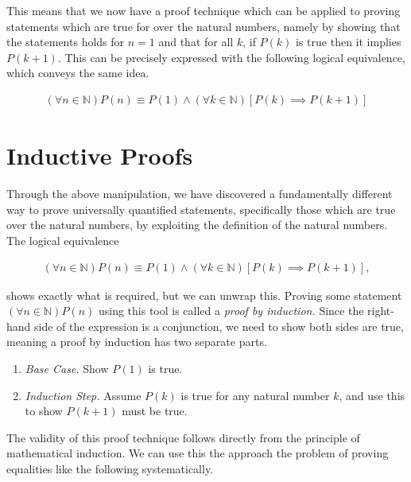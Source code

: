 \documentclass[twoside]{report}
\begin{document}
This means that we now have a proof technique which can be applied to proving statements which are true for over the natural numbers, namely by showing that the statements holds for $n = 1$ and that for all $k$, if $P(k)$ is true then it implies $P(k + 1)$. This can be precisely expressed with the following logical equivalence, which conveys the same idea.

\begin{align*}
	(\forall n \in \mathbb{N})P(n) \equiv P(1) \land (\forall k \in \mathbb{N})[P(k) \implies P(k + 1)]
\end{align*}

\section{Inductive Proofs}

Through the above manipulation, we have discovered a fundamentally different way to prove universally quantified statements, specifically those which are true over the natural numbers, by exploiting the definition of the natural numbers. The logical equivalence

\begin{align*}
	(\forall n \in \mathbb{N})P(n) \equiv P(1) \land (\forall k \in \mathbb{N})[P(k) \implies P(k + 1)],
\end{align*}

shows exactly what is required, but we can unwrap this. Proving some statement $(\forall n \in \mathbb{N})P(n)$ using this tool is called a \emph{proof by induction.} Since the right-hand side of the expression is a conjunction, we need to show both sides are true, meaning a proof by induction has two separate parts.

\vspace{\baselineskip}
\begin{enumerate}
	\item \emph{Base Case.} Show $P(1)$ is true.
	\item \emph{Induction Step.} Assume $P(k)$ is true for any natural number $k$, and use this to show $P(k + 1)$ must be true.
\end{enumerate}
\vspace{\baselineskip}

The validity of this proof technique follows directly from the principle of mathematical induction. We can use this the approach the problem of proving equalities like the following systematically.
\end{document}
